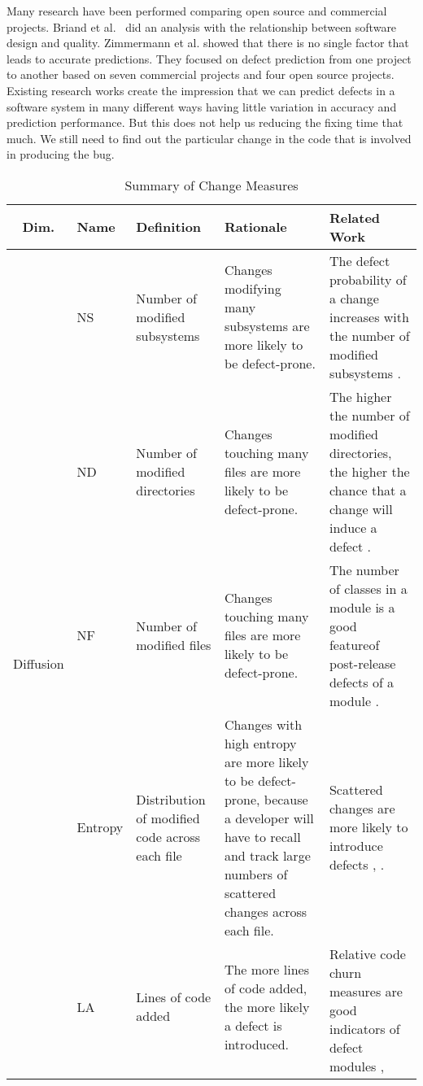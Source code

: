 \documentclass[10pt, conference]{IEEEtran}
\begin{document}
Many research have been performed comparing open source and commercial projects. Briand et al.~\cite{Briand1999ICSE} did an analysis with the relationship between software design and quality. Zimmermann et al.\cite{Zimmermann2009ESECS} showed that there is no single factor that leads to accurate predictions. They focused on defect prediction from one project to another based on seven commercial projects and four open source projects. Existing research works create the impression that we can predict defects in a software system in many different ways having little variation in accuracy and prediction performance. But this does not help us reducing the fixing time that much. We still need to find out the particular change in the code that is involved in producing the bug.

\begin{table*}[t]
	\centering
	\caption{Summary of Change Measures}
	\begin{tabular}{|c|l|p{2.5cm}|p{5.5cm}|p{5.25cm}|}
		\hline Dim. & Name & Definition & Rationale & Related Work \\ 
		\hline \multirow{14}{*}{\begin{sideways}Diffusion\end{sideways}} & NS & Number of modified subsystems  & Changes modifying many subsystems are more likely to be defect-prone. & The defect probability of a change increases with the number of modified subsystems \cite{Mockus2000Bell}. \\ \cline{2-5}  
		& ND & Number of modified directories & Changes touching many files are more likely to be defect-prone. & The higher the number of modified directories, the higher the chance that a change will induce a defect \cite{Mockus2000Bell}. \\ \cline{2-5}  
		& NF & Number of modified files & Changes touching many files are more likely to be defect-prone. & The number of classes in a module is a good featureof post-release defects of a module \cite{Nagappan2006ICSE}. \\ \cline{2-5} 
		& Entropy & Distribution of modified code across each file & Changes with high entropy are more likely to be defect-prone, because a developer will have to recall and track large numbers of scattered changes across each file. & Scattered changes are more likely to introduce defects \cite{DAmbross2010MSR}, \cite{Hassan2009ICSE}. \\ 
		\hline \multirow{4}{*}{\begin{sideways}Size\end{sideways}} & LA & Lines of code added & The more lines of code added, the more likely a defect is introduced. & \multirow{2}{5.25cm}{Relative code churn measures are good indicators of defect modules \cite{Moser2008ICSE}, \cite{Nagappan2005ICSE}}. \\ \cline{2-4} 

\end{tabular}
\end{table*}
\end{document}
